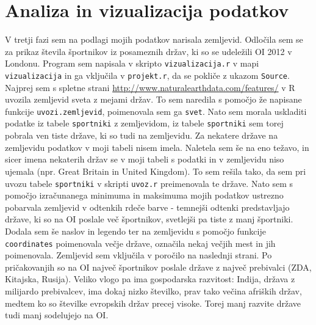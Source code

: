 \documentclass[11pt,a4paper]{article}
\begin{document}


\section{Analiza in vizualizacija podatkov}
V tretji fazi sem na podlagi mojih podatkov narisala zemljevid. Odločila sem se za prikaz števila športnikov iz posameznih držav, ki so se udeležili OI 2012 v Londonu.
\newline
Program sem napisala v skripto \verb|vizualizacija.r| v mapi \verb|vizualizacija| in ga vključila v \verb|projekt.r|, da se pokliče z ukazom \verb|Source|.
\newline
Najprej sem s spletne strani \url{http://www.naturalearthdata.com/features/} v R uvozila zemljevid sveta z mejami držav. To sem naredila s pomočjo že napisane funkcije \verb|uvozi.zemljevid|, poimenovala sem ga \verb|svet|. Nato sem morala uskladiti 
podatke iz tabele \verb|sportniki| z zemljevidom, iz tabele \verb|sportniki| sem torej pobrala ven tiste države, ki so tudi na zemljevidu. Za nekatere države na zemljevidu podatkov v moji tabeli nisem imela. Naletela sem še na eno težavo, in sicer imena nekaterih držav se v moji tabeli s podatki in v zemljevidu niso ujemala (npr. Great Britain in United Kingdom). To sem rešila tako, da sem pri uvozu tabele \verb|sportniki| v skripti \verb|uvoz.r| preimenovala te države.
\newline
Nato sem s pomočjo izračunanega minimuma in maksimuma mojih podatkov ustrezno pobarvala zemljevid v odtenkih rdeče barve - temnejši odtenki predstavljajo države, ki so na OI poslale več športnikov, svetlejši pa tiste z manj športniki.
Dodala sem še naslov in legendo ter na zemljevidu s pomočjo funkcije \verb|coordinates| poimenovala večje države, označila nekaj večjih mest in jih poimenovala.
\newline
Zemljevid sem vključila v poročilo na naslednji strani. Po pričakovanjih so na OI največ športnikov poslale države z največ prebivalci (ZDA, Kitajska, Rusija). Veliko vlogo pa ima gospodarska razvitost: Indija, država z milijardo prebivalcev, ima dokaj nizko številko, prav tako večina afriških držav, medtem ko so številke evropskih držav precej visoke. Torej manj razvite države tudi manj sodelujejo na OI.


\newpage
\end{document}
